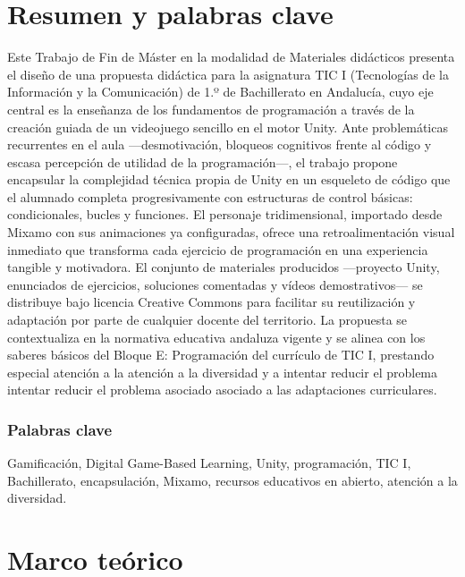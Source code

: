 \documentclass[a4paper,12pt]{article}
\begin{document}




\newpage
{}
\hypertarget{toc-anchor}{}
\tableofcontents
\newpage

\section{Resumen y palabras clave}

Este Trabajo de Fin de Máster en la modalidad de Materiales didácticos presenta el diseño de una propuesta didáctica para la asignatura TIC I (Tecnologías de la Información y la Comunicación) de 1.º de Bachillerato en Andalucía, cuyo eje central es la enseñanza de los fundamentos de programación a través de la creación guiada de un videojuego sencillo en el motor Unity. Ante problemáticas recurrentes en el aula —desmotivación, bloqueos cognitivos frente al código y escasa percepción de utilidad de la programación—, el trabajo propone encapsular la complejidad técnica propia de Unity en un esqueleto de código que el alumnado completa progresivamente con estructuras de control básicas: condicionales, bucles y funciones. El personaje tridimensional, importado desde Mixamo\cite{mixamoDocs}  con sus animaciones ya configuradas, ofrece una retroalimentación visual inmediato que transforma cada ejercicio de programación en una experiencia tangible y motivadora. El conjunto de materiales producidos —proyecto Unity, enunciados de ejercicios, soluciones comentadas y vídeos demostrativos— se distribuye bajo licencia Creative Commons para facilitar su reutilización y adaptación por parte de cualquier docente del territorio. La propuesta se contextualiza en la normativa educativa andaluza vigente y se alinea con los saberes básicos del Bloque E: Programación del currículo de TIC I, prestando especial atención a la atención a la diversidad y a intentar reducir el problema intentar reducir el problema asociado asociado a las adaptaciones curriculares.

\subsubsection*{Palabras clave} 

Gamificación, Digital Game-Based Learning, Unity, programación, TIC I, Bachillerato, encapsulación, Mixamo, recursos educativos en abierto, atención a la diversidad.

\section{Marco teórico}
\end{document}
